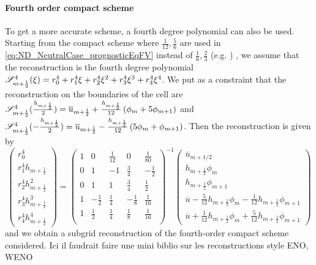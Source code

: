 \paragraph{Fourth order compact scheme}
To get a more accurate scheme,
a fourth degree polynomial can also be used.
Starting from the compact scheme where
$\frac{1}{12}, \frac{5}{6}$ are used in
\eqref{eq:ND_NeutralCase_prognosticEqFV} instead of
$\frac{1}{6}, \frac{2}{3}$ (e.g. \cite{adam_highly_1977}) ,
we assume that the reconstruction is the fourth degree
polynomial
${\cal S}_{m+\frac{1}{2}}^4(\xi) = r_0^4 + r_1^4 \xi + r_2^4 \xi^2 
+ r_3^4 \xi^3 + r_4^4 \xi^4$. We put as a constraint that the
reconstruction on the boundaries of the cell are
${\cal S}^4_{m+\frac{1}{2}}(\frac{h_{m+\frac{1}{2}}}{2}) =
\overline{u}_{m+\frac{1}{2}} + \frac{h_{m+\frac{1}{2}}}{12}\left(
\phi_m + 5\phi_{m+1}\right) $ and
${\cal S}^4_{m+\frac{1}{2}}(-\frac{h_{m+\frac{1}{2}}}{2}) =
\overline{u}_{m+\frac{1}{2}} - \frac{h_{m+\frac{1}{2}}}{12}\left(
5\phi_m + \phi_{m+1}\right)$.
Then the reconstruction is given by
\begin{equation}
    \begin{pmatrix}
    r_0^4 \\
    r_1^4 h_{m+\frac{1}{2}} \\
    r_2^4 h_{m+\frac{1}{2}}^2 \\
    r_3^4 h_{m+\frac{1}{2}}^3 \\
    r_4^4 h_{m+\frac{1}{2}}^4
    \end{pmatrix}
     = 
    \begin{pmatrix}
    1 & 0 & \frac{1}{12} & 0 & \frac{1}{80} \\
    0 & 1 & -1 & \frac{3}{4} & -\frac{1}{2} \\
    0 & 1 & 1 & \frac{3}{4} & \frac{1}{2} \\
    1 & -\frac{1}{2} & \frac{1}{4} & -\frac{1}{8}
    & \frac{1}{16} \\
    1 & \frac{1}{2} & \frac{1}{4} & \frac{1}{8}
    & \frac{1}{16} \\
    \end{pmatrix}^{-1}
    \begin{pmatrix}
    \overline{u}_{m+1/2} \\
    h_{m+\frac{1}{2}} \phi_m \\
	    h_{m+\frac{1}{2}} \phi_{m+1} \\
	    \overline{u} - \frac{5}{12} h_{m+\frac{1}{2}} \phi_m - \frac{1}{12} h_{m+\frac{1}{2}} \phi_{m+1} \\
	    \overline{u} + \frac{1}{12} h_{m+\frac{1}{2}} \phi_m + \frac{5}{12} h_{m+\frac{1}{2}} \phi_{m+1}
    \end{pmatrix}
\end{equation}
and we obtain a subgrid reconstruction of the fourth-order
compact scheme considered.
{\color{red} Ici il faudrait faire une mini biblio sur les
reconstructions style ENO, WENO}

